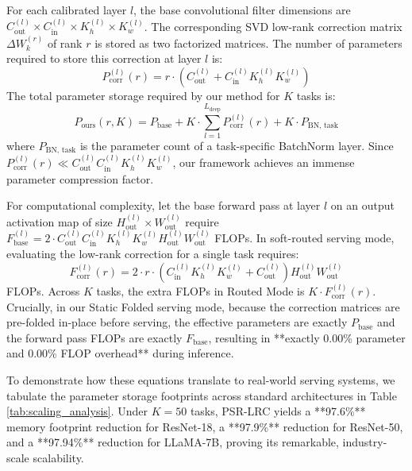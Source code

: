\documentclass{article}
\theoremstyle{plain}
\theoremstyle{definition}
\theoremstyle{remark}
\begin{document}
For each calibrated layer $l$, the base convolutional filter dimensions are $C_{\text{out}}^{(l)} \times C_{\text{in}}^{(l)} \times K_h^{(l)} \times K_w^{(l)}$. The corresponding SVD low-rank correction matrix $\Delta W_k^{(r)}$ of rank $r$ is stored as two factorized matrices. The number of parameters required to store this correction at layer $l$ is:
\begin{equation}
    P_{\text{corr}}^{(l)}(r) = r \cdot \left( C_{\text{out}}^{(l)} + C_{\text{in}}^{(l)} K_h^{(l)} K_w^{(l)} \right)
\end{equation}
The total parameter storage required by our method for $K$ tasks is:
\begin{equation}
    P_{\text{ours}}(r, K) = P_{\text{base}} + K \cdot \sum_{l=1}^{L_{\text{deep}}} P_{\text{corr}}^{(l)}(r) + K \cdot P_{\text{BN, task}}
\end{equation}
where $P_{\text{BN, task}}$ is the parameter count of a task-specific BatchNorm layer. Since $P_{\text{corr}}^{(l)}(r) \ll C_{\text{out}}^{(l)} C_{\text{in}}^{(l)} K_h^{(l)} K_w^{(l)}$, our framework achieves an immense parameter compression factor. 

For computational complexity, let the base forward pass at layer $l$ on an output activation map of size $H_{\text{out}}^{(l)} \times W_{\text{out}}^{(l)}$ require $F_{\text{base}}^{(l)} = 2 \cdot C_{\text{out}}^{(l)} C_{\text{in}}^{(l)} K_h^{(l)} K_w^{(l)} H_{\text{out}}^{(l)} W_{\text{out}}^{(l)}$ FLOPs. In soft-routed serving mode, evaluating the low-rank correction for a single task requires:
\begin{equation}
    F_{\text{corr}}^{(l)}(r) = 2 \cdot r \cdot \left( C_{\text{in}}^{(l)} K_h^{(l)} K_w^{(l)} + C_{\text{out}}^{(l)} \right) H_{\text{out}}^{(l)} W_{\text{out}}^{(l)}
\end{equation}
FLOPs. Across $K$ tasks, the extra FLOPs in Routed Mode is $K \cdot F_{\text{corr}}^{(l)}(r)$.
Crucially, in our Static Folded serving mode, because the correction matrices are pre-folded in-place before serving, the effective parameters are exactly $P_{\text{base}}$ and the forward pass FLOPs are exactly $F_{\text{base}}$, resulting in **exactly 0.00\% parameter and 0.00\% FLOP overhead** during inference.

To demonstrate how these equations translate to real-world serving systems, we tabulate the parameter storage footprints across standard architectures in Table \ref{tab:scaling_analysis}. Under $K=50$ tasks, PSR-LRC yields a **97.6\%** memory footprint reduction for ResNet-18, a **97.9\%** reduction for ResNet-50, and a **97.94\%** reduction for LLaMA-7B, proving its remarkable, industry-scale scalability.
\end{document}
